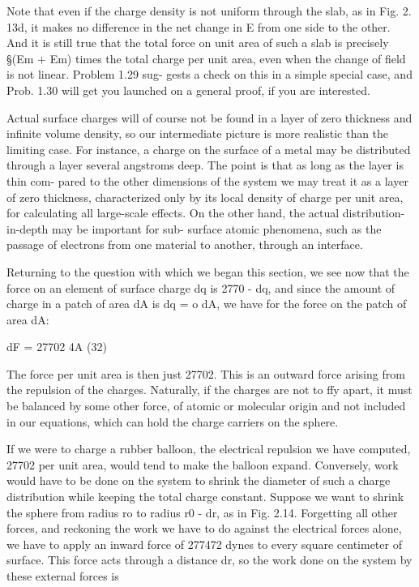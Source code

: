  

Note that even if the charge density is not uniform through the slab,
as in Fig. 2. 13d, it makes no difference in the net change in E from one
side to the other. And it is still true that the total force on unit area
of such a slab is precisely §(Em + Em) times the total charge per unit
area, even when the change of field is not linear. Problem 1.29 sug-
gests a check on this in a simple special case, and Prob. 1.30 will get
you launched on a general proof, if you are interested.

Actual surface charges will of course not be found in a layer of zero
thickness and infinite volume density, so our intermediate picture is
more realistic than the limiting case. For instance, a charge on the
surface of a metal may be distributed through a layer several
angstroms deep. The point is that as long as the layer is thin com-
pared to the other dimensions of the system we may treat it as a layer
of zero thickness, characterized only by its local density of charge
per unit area, for calculating all large-scale effects. On the other
hand, the actual distribution-in-depth may be important for sub-
surface atomic phenomena, such as the passage of electrons from one
material to another, through an interface.

Returning to the question with which we began this section, we see
now that the force on an element of surface charge dq is 2770 - dq, and
since the amount of charge in a patch of area dA is dq = o dA, we
have for the force on the patch of area dA:

dF = 27702 4A (32)

The force per unit area is then just 27702. This is an outward force
arising from the repulsion of the charges. Naturally, if the charges
are not to ffy apart, it must be balanced by some other force, of atomic
or molecular origin and not included in our equations, which can hold
the charge carriers on the sphere.

If we were to charge a rubber balloon, the electrical repulsion we
have computed, 27702 per unit area, would tend to make the balloon
expand. Conversely, work would have to be done on the system to
shrink the diameter of such a charge distribution while keeping the
total charge constant. Suppose we want to shrink the sphere from
radius ro to radius r0 - dr, as in Fig. 2.14. Forgetting all other
forces, and reckoning the work we have to do against the electrical
forces alone, we have to apply an inward force of 277472 dynes to every
square centimeter of surface. This force acts through a distance dr,
so the work done on the system by these external forces is


